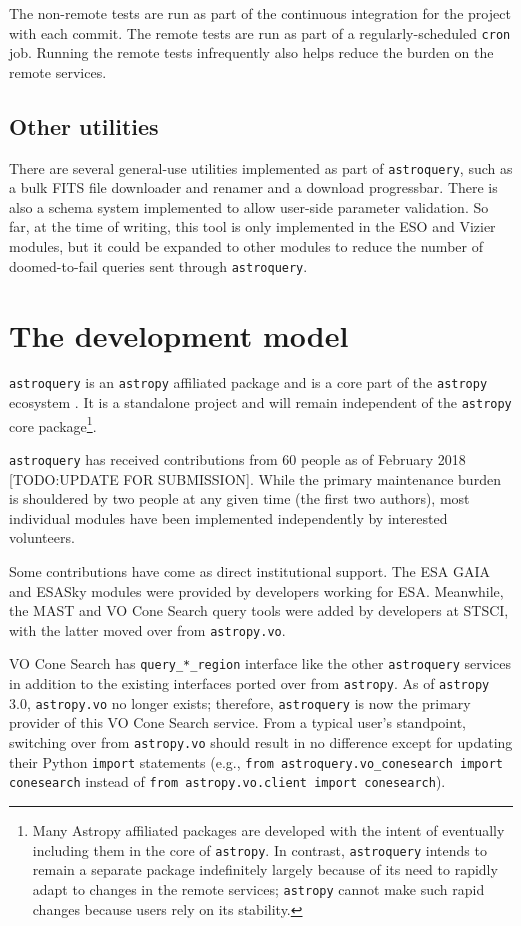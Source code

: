 \documentclass[twocolumn]{aastex61}
\newcommand{\package}[1]{\texttt{#1}\xspace}
\newcommand{\astroquery}{\package{astroquery}}
\newcommand{\astropy}{Astropy\xspace}
\newcommand{\astropypkg}{\package{astropy}}
\begin{document}
The non-remote tests are run as part of the continuous integration for the
project with each commit.  The remote tests are run as part of a
regularly-scheduled \texttt{cron} job.  Running the remote tests infrequently
also helps reduce the burden on the remote services.

\subsection{Other utilities}
There are several general-use utilities implemented as part of \astroquery, such
as a bulk FITS file downloader and renamer and a download progressbar.  There
is also a schema system implemented to allow user-side parameter validation.
So far, at the time of writing, this tool is only implemented in the ESO and
Vizier modules, but it could be expanded to other modules to reduce the number
of doomed-to-fail queries sent through \astroquery.

\section{The development model}
\label{sec:development}
\astroquery is an \astropypkg affiliated package and is a core part of the
\astropypkg ecosystem \citep{Astropy-Collaboration2013a}.  It is a standalone
project and will remain independent of the \astropypkg core
package\footnote{Many \astropy affiliated packages are developed with the
intent of eventually including them in the core of \astropypkg.  In contrast,
\astroquery intends to remain a separate package indefinitely largely because
of its need to rapidly adapt to changes in the remote services; \astropypkg
cannot make such rapid changes because users rely on its stability.}.

\astroquery has received contributions from 60 people as of February 2018
{\color{red}[TODO:UPDATE FOR SUBMISSION]}.  While the primary maintenance
burden is shouldered by two people at any given time (the first two authors),
most individual modules have been implemented independently by interested
volunteers.

Some contributions have come as direct institutional support.  The ESA GAIA and
ESASky modules were provided by developers working for ESA.  Meanwhile, the
MAST and VO Cone Search query tools were added by developers at STSCI, with the
latter moved over from \texttt{astropy.vo}.

VO Cone Search has \texttt{query\_*\_region} interface like the other
\astroquery services in addition to the existing interfaces ported over from
\astropypkg. As of \astropypkg 3.0, \texttt{astropy.vo} no longer exists;
therefore, \astroquery is now the primary provider of this VO Cone Search
service. From a typical user's standpoint, switching over from
\texttt{astropy.vo} should result in no difference except for updating their
Python \texttt{import} statements (e.g., \texttt{from astroquery.vo\_conesearch import
conesearch} instead of \texttt{from astropy.vo.client import conesearch}).
\end{document}
